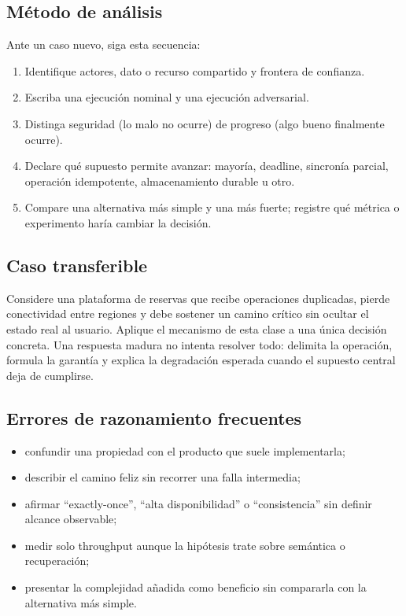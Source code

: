 \documentclass[variant=apuntes,cover=institutional,mode=screen]{ua-engineering-v6-article}
\begin{document}
\subsection{Método de análisis}
Ante un caso nuevo, siga esta secuencia:
\begin{enumerate}
\item Identifique actores, dato o recurso compartido y frontera de confianza.
\item Escriba una ejecución nominal y una ejecución adversarial.
\item Distinga seguridad (lo malo no ocurre) de progreso (algo bueno finalmente ocurre).
\item Declare qué supuesto permite avanzar: mayoría, deadline, sincronía parcial, operación idempotente, almacenamiento durable u otro.
\item Compare una alternativa más simple y una más fuerte; registre qué métrica o experimento haría cambiar la decisión.
\end{enumerate}

\subsection{Caso transferible}
Considere una plataforma de reservas que recibe operaciones duplicadas, pierde conectividad entre regiones y debe sostener un camino crítico sin ocultar el estado real al usuario. Aplique el mecanismo de esta clase a una única decisión concreta. Una respuesta madura no intenta resolver todo: delimita la operación, formula la garantía y explica la degradación esperada cuando el supuesto central deja de cumplirse.

\subsection{Errores de razonamiento frecuentes}
\begin{itemize}
\item confundir una propiedad con el producto que suele implementarla;
\item describir el camino feliz sin recorrer una falla intermedia;
\item afirmar ``exactly-once'', ``alta disponibilidad'' o ``consistencia'' sin definir alcance observable;
\item medir solo throughput aunque la hipótesis trate sobre semántica o recuperación;
\item presentar la complejidad añadida como beneficio sin compararla con la alternativa más simple.
\end{itemize}
\end{document}
